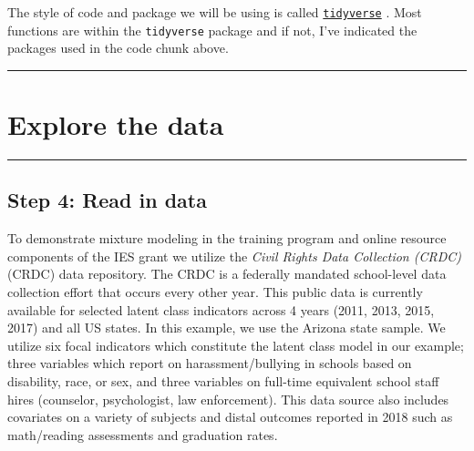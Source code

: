 \documentclass[
]{book}
\begin{document}
The style of code and package we will be using is called \href{https://www.tidyverse.org/}{\texttt{tidyverse}}\citep{wickham2019} .
Most functions are within the \texttt{tidyverse} package and if not, I've indicated the packages used in the code chunk above.

\begin{center}\rule{0.5\linewidth}{0.5pt}\end{center}

\section{Explore the data}\label{explore-the-data}

\begin{center}\rule{0.5\linewidth}{0.5pt}\end{center}

\subsection{Step 4: Read in data}\label{step-4-read-in-data}

To demonstrate mixture modeling in the training program and online resource components of the IES grant we utilize the \emph{Civil Rights Data Collection (CRDC)} (CRDC) data repository.
The CRDC is a federally mandated school-level data collection effort that occurs every other year.
This public data is currently available for selected latent class indicators across 4 years (2011, 2013, 2015, 2017) and all US states.
In this example, we use the Arizona state sample.
We utilize six focal indicators which constitute the latent class model in our example; three variables which report on harassment/bullying in schools based on disability, race, or sex, and three variables on full-time equivalent school staff hires (counselor, psychologist, law enforcement).
This data source also includes covariates on a variety of subjects and distal outcomes reported in 2018 such as math/reading assessments and graduation rates.
\end{document}

